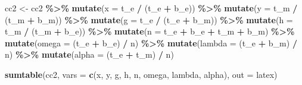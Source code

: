 \documentclass[10pt]{article}
\newenvironment{Shaded}{\begin{snugshade}}{\end{snugshade}}
\newcommand{\AttributeTok}[1]{\textcolor[rgb]{0.13,0.29,0.53}{#1}}
\newcommand{\FunctionTok}[1]{\textcolor[rgb]{0.13,0.29,0.53}{\textbf{#1}}}
\newcommand{\NormalTok}[1]{#1}
\newcommand{\OtherTok}[1]{\textcolor[rgb]{0.56,0.35,0.01}{#1}}
\newcommand{\SpecialCharTok}[1]{\textcolor[rgb]{0.81,0.36,0.00}{\textbf{#1}}}
\newcommand{\StringTok}[1]{\textcolor[rgb]{0.31,0.60,0.02}{#1}}
\begin{document}
\begin{Shaded}
\begin{Highlighting}[]
\NormalTok{cc2 }\OtherTok{\textless{}{-}}\NormalTok{ cc2 }\SpecialCharTok{\%\textgreater{}\%}
  \FunctionTok{mutate}\NormalTok{(}\AttributeTok{x =}\NormalTok{ t\_e }\SpecialCharTok{/}\NormalTok{ (t\_e }\SpecialCharTok{+}\NormalTok{ b\_e)) }\SpecialCharTok{\%\textgreater{}\%}
  \FunctionTok{mutate}\NormalTok{(}\AttributeTok{y =}\NormalTok{ t\_m }\SpecialCharTok{/}\NormalTok{ (t\_m }\SpecialCharTok{+}\NormalTok{ b\_m)) }\SpecialCharTok{\%\textgreater{}\%}
  \FunctionTok{mutate}\NormalTok{(}\AttributeTok{g =}\NormalTok{ t\_e }\SpecialCharTok{/}\NormalTok{ (t\_e }\SpecialCharTok{+}\NormalTok{ b\_m)) }\SpecialCharTok{\%\textgreater{}\%}
  \FunctionTok{mutate}\NormalTok{(}\AttributeTok{h =}\NormalTok{ t\_m }\SpecialCharTok{/}\NormalTok{ (t\_m }\SpecialCharTok{+}\NormalTok{ b\_e)) }\SpecialCharTok{\%\textgreater{}\%}
  \FunctionTok{mutate}\NormalTok{(}\AttributeTok{n =}\NormalTok{ t\_e }\SpecialCharTok{+}\NormalTok{ b\_e }\SpecialCharTok{+}\NormalTok{ t\_m }\SpecialCharTok{+}\NormalTok{ b\_m) }\SpecialCharTok{\%\textgreater{}\%}
  \FunctionTok{mutate}\NormalTok{(}\AttributeTok{omega =}\NormalTok{ (t\_e }\SpecialCharTok{+}\NormalTok{ b\_e) }\SpecialCharTok{/}\NormalTok{ n) }\SpecialCharTok{\%\textgreater{}\%}
  \FunctionTok{mutate}\NormalTok{(}\AttributeTok{lambda =}\NormalTok{ (t\_e }\SpecialCharTok{+}\NormalTok{ b\_m) }\SpecialCharTok{/}\NormalTok{ n) }\SpecialCharTok{\%\textgreater{}\%}
  \FunctionTok{mutate}\NormalTok{(}\AttributeTok{alpha =}\NormalTok{ (t\_e }\SpecialCharTok{+}\NormalTok{ t\_m) }\SpecialCharTok{/}\NormalTok{ n)}

\FunctionTok{sumtable}\NormalTok{(cc2, }
         \AttributeTok{vars =} \FunctionTok{c}\NormalTok{(}\StringTok{\textquotesingle{}x\textquotesingle{}}\NormalTok{, }\StringTok{\textquotesingle{}y\textquotesingle{}}\NormalTok{, }\StringTok{\textquotesingle{}g\textquotesingle{}}\NormalTok{, }\StringTok{\textquotesingle{}h\textquotesingle{}}\NormalTok{, }\StringTok{\textquotesingle{}n\textquotesingle{}}\NormalTok{, }\StringTok{\textquotesingle{}omega\textquotesingle{}}\NormalTok{, }\StringTok{\textquotesingle{}lambda\textquotesingle{}}\NormalTok{, }\StringTok{\textquotesingle{}alpha\textquotesingle{}}\NormalTok{),}
         \AttributeTok{out =} \StringTok{\textquotesingle{}latex\textquotesingle{}}\NormalTok{)}
\end{Highlighting}
\end{Shaded}
\end{document}
